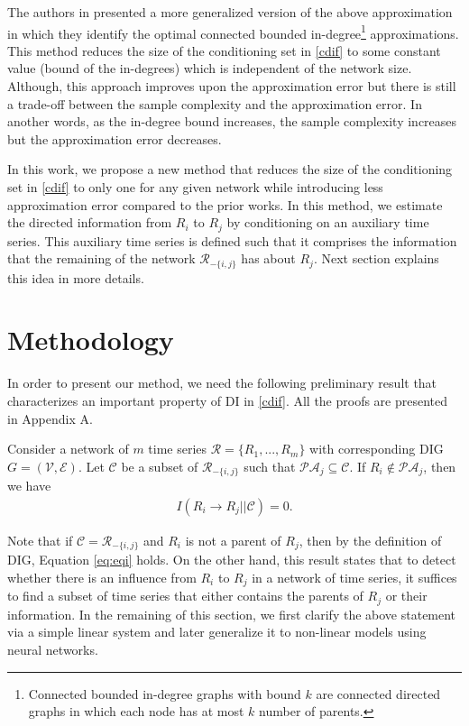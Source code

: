 The authors in \citet{quinn2015bounded} presented a more generalized version of the above approximation in which they identify the optimal connected bounded in-degree\footnote{Connected bounded in-degree graphs with bound $k$ are connected directed graphs in which each node has at most $k$ number of parents.} approximations.  
This method reduces the size of the conditioning set in \eqref{cdif} to some constant value (bound of the in-degrees) which is independent of the network size. 
Although, this approach improves upon the approximation error but there is still a trade-off between the sample complexity and the approximation error. In another words, as the in-degree bound increases, the sample complexity increases but the approximation error decreases.


In this work, we propose a new method that reduces the size of the conditioning set in \eqref{cdif} to only one for any given network while introducing less approximation error compared to the prior works. 
In this method, we estimate the directed information from $R_i$ to $R_j$ by conditioning on an auxiliary time series. This auxiliary time series is defined such that it comprises the information that the remaining of the network $\mathcal{R}_{-\{i,j\}}$ has about $R_j$.
Next section explains this idea in more details.



\section{Methodology}\label{sec:method}

In order to present our method, we need the following preliminary result that characterizes an important property of DI in \eqref{cdif}. All the proofs are presented in Appendix A.

\begin{lemma}\label{lemma:small}
Consider a network of $m$ time series $\mathcal{R}=\{R_1,...,R_m\}$ with corresponding DIG $G=(\mathcal{V},\mathcal{E})$. Let $\mathcal{C}$ be a subset of $\mathcal{R}_{-\{i,j\}}$ such that $\mathcal{PA}_j\subseteq \mathcal{C}$. If $R_i\not\in\mathcal{PA}_j$, then we have
\begin{align}\label{eq:eqi}
I(R_i\rightarrow R_j||\mathcal{C})=0.
\end{align}
\end{lemma}
Note that if $\mathcal{C}=\mathcal{R}_{-\{i,j\}}$ and $R_i$ is not a parent of $R_j$, then by the definition of DIG, Equation  \eqref{eq:eqi} holds.
On the other hand, this result states that to detect whether there is an influence from $R_i$ to $R_j$ in a network of time series, it suffices to find a subset of time series that either contains the parents of $R_j$ or their information.
In the remaining of this section, we first clarify the above statement via a simple linear system and later generalize it to non-linear models using neural networks.

